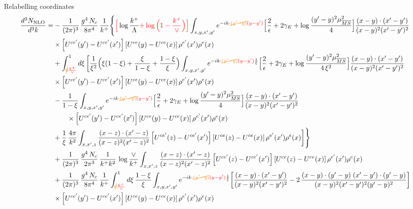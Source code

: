 \documentclass[9pt]{article}
\numberwithin{equation}{section}
\begin{document}
Relabelling coordinates
\begin{align}
\frac{d^{3}N_{\rm NLO}}{d^{3}k}= &-\frac{1}{(2\pi)^{3}}\,\frac{g^{4}\,N_{c}}{8\pi^{4}}\,\frac{1}{k^{+}}\Bigg\{{\color{red}\Big[}\log\frac{k^{+}}{\Lambda}{\color{red}+\log\Big(1-\frac{k^{+}}{\vee}\Big)\Big]}\int_{x,y,x',y'}e^{-ik\cdot{\color{orange}\cancel{(y'-y)}}{\color{red}(y-y')}}\Big[\frac{2}{\epsilon}+2\gamma_{E}+\log\frac{(y'-y)^{2}\mu^{2}_{\overline{MS}}}{4}\Big]\frac{(x-y)\cdot(x'-y')}{(x-y)^{2}(x'-y')^{2}}\notag\\
&\times\left[U^{ce'}(y') - U^{ce'}(x')\right]\left[U^{ce}(y) - U^{ce}(x)\right]\rho^{e'}(x')\rho^{e}(x)\notag\\
&+\int_{{\color{orange}\cancel{0}}{\color{red}\frac{k^{+}}{\vee}}}^{1}d\xi\,\bigg[\frac{1}{\xi^{2}}\Big(\xi(1-\xi)+\frac{\xi}{1-\xi}+\frac{1-\xi}{\xi}\Big)\int_{x,y,x',y'}e^{-ik\cdot{\color{orange}\cancel{(y'-y)}}{\color{red}(y-y')}\frac{1}{\xi}}\Big[\frac{2}{\epsilon}+2\gamma_{E}+\log\frac{(y'-y)^{2}\mu^{2}_{\overline{MS}}}{4\,\xi^{2}}\Big]\frac{(x-y)\cdot(x'-y')}{(x-y)^{2}(x'-y')^{2}}\notag\\
&\times\left[U^{ce'}(y') - U^{ce'}(x')\right]\left[U^{ce}(y) - U^{ce}(x)\right]\rho^{e'}(x')\rho^{e}(x)\notag\\
&-\frac{1}{1-\xi}\int_{x,y,x',y'}e^{-ik\cdot{\color{orange}\cancel{(y'-y)}}{\color{red}(y-y')}}\Big[\frac{2}{\epsilon}+2\gamma_{E}+\log\frac{(y'-y)^{2}\mu^{2}_{\overline{MS}}}{4}\Big]\frac{(x-y)\cdot(x'-y')}{(x-y)^{2}(x'-y')^{2}}\notag \\ & \qquad\times\left[U^{ce'}(y') - U^{ce'}(x')\right]\left[U^{ce}(y) - U^{ce}(x)\right]\rho^{e'}(x')\rho^{e}(x)\notag\\
&+\frac{1}{\xi}\,\frac{4\pi}{k^{2}}\int_{x,x',z}\frac{(x-z)\cdot(x'-z)}{(x-z)^{2}(x'-z)^{2}}\left[U^{ce'}(z) - U^{ce'}(x')\right]\left[U^{ce}(z) - U^{ce}(x)\right]\rho^{e'}(x')\rho^{e}(x)\bigg]\Bigg\}\notag\\
&+\frac{1}{(2\pi)^{3}}\,\frac{g^{4}\,N_{c}}{2\pi^{3}}\,\frac{1}{k^{+}k^{2}}\,\log\frac{\vee}{k^{+}}\int_{x,x',z}\frac{(x-z)\cdot(x'-z)}{(x-z)^{2}(x'-z)^{2}}\left[U^{ce'}(z) - U^{ce'}(x')\right]\left[U^{ce}(z) - U^{ce}(x)\right]\rho^{e'}(x')\rho^{e}(x)\notag\\
&+\frac{1}{(2\pi)^{3}}\,\frac{g^{4}\,N_{c}}{8\pi^{4}}\,\frac{1}{k^{+}}\int_{{\color{orange}\cancel{0}}{\color{red}\frac{k^{+}}{\vee}}}^{1}d\xi\,\frac{1-\xi}{\xi}\int_{x,y,x',y'}e^{-ik\cdot{\color{orange}\cancel{(y'-y)}}{\color{red}(y-y')}\frac{1}{\xi}}\bigg[\frac{(x-y)\cdot(x'-y')}{(x-y)^{2}(x'-y')^{2}}-2\,\frac{(x-y)\cdot(y'-y)\;(x'-y')\cdot(y'-y)}{(x-y)^{2}(x'-y')^{2}(y'-y)^{2}}\bigg]\notag\\
&\times\left[U^{ce'}(y') - U^{ce'}(x')\right]\left[U^{ce}(y) - U^{ce}(x)\right]\rho^{e'}(x')\rho^{e}(x)
\end{align}
\end{document}
